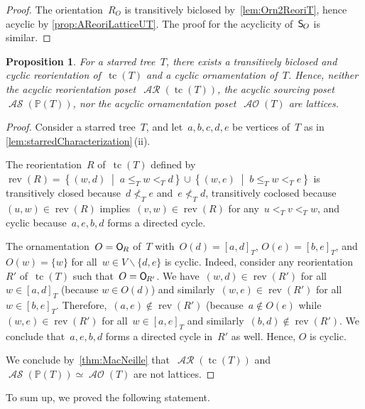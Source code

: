 \documentclass{amsart}
\newtheorem{proposition}[theorem]{Proposition}
\theoremstyle{definition}
\renewcommand{\c}[1]{\mathcal{#1}} %
\newcommand{\set}[2]{\left\{ #1 \;\middle|\; #2 \right\}} %
\newcommand{\ssm}{\smallsetminus} %
\DeclareMathOperator{\tc}{tc} %
\newcommand{\mymap}[2]{\mathsf{#1}_{\hspace{-.7pt}#2}}
\newcommand{\orn}[1]{\mymap{O}{#1}}  %
\DeclareMathOperator{\AOrn}{\c{AO}}  %
\DeclareMathOperator{\AReori}{\c{AR}}  %
\DeclareMathOperator{\rev}{rev} %
\newcommand{\sour}[1]{\mymap{S}{#1}}  %
\DeclareMathOperator{\ASour}{\mathcal{AS}}  %
\newcommand{\PP}{\mathbb P} %
\begin{document}
\begin{proof}
The orientation~$R_O$ is transitively biclosed by~\cref{lem:Orn2ReoriT}, hence acyclic by \cref{prop:AReoriLatticeUT}.
The proof for the acyclicity of~$\sour{O}$ is similar.
\end{proof}

\begin{proposition}
For a starred tree~$T$, there exists a transitively biclosed and cyclic reorientation \linebreak of~$\tc(T)$ and a cyclic ornamentation of~$T$.
Hence, neither the acyclic reorientation poset~$\AReori(\tc(T))$, the acyclic sourcing poset~$\ASour(\PP(T))$, nor the acyclic ornamentation poset~$\AOrn(T)$ are lattices.
\end{proposition}

\begin{proof}
Consider a starred tree~$T$, and let~$a,b,c,d,e$ be vertices of~$T$ as in \cref{lem:starredCharacterization}\,(ii).

The reorientation~$R$ of~$\tc(T)$ defined by~$\rev(R) = \set{(w,d)}{a \le_T w <_T d} \cup \set{(w,e)}{b \le_T w <_T e}$ is transitively closed because~$d \not<_T e$ and~$e \not<_T d$, transitively coclosed because~$(u,w) \in \rev(R)$ implies~$(v,w) \in \rev(R)$ for any~$u <_T v <_T w$, and cyclic because~$a, e, b, d$ forms a directed cycle.

The ornamentation~$O = \orn{R}$ of~$T$ with~$O(d) = [a,d]_T$, $O(e) = [b,e]_T$, and~$O(w) = \{w\}$ for all~$w \in V \ssm \{d,e\}$ is cyclic.
Indeed, consider any reorientation~$R'$ of~$\tc(T)$ such that~$O = \orn{R'}$.
We have~$(w,d) \in \rev(R')$ for all~$w \in [a,d]_T$ (because $w \in O(d)$) and similarly~$(w,e) \in \rev(R')$ for all~$w \in [b,e]_T$.
Therefore,~$(a,e) \notin \rev(R')$ (because~${a \notin O(e)}$ while~$(w,e) \in \rev(R')$ for all~$w \in [a,e]_T$ and similarly~$(b,d) \notin \rev(R')$.
We conclude that~$a, e, b, d$ forms a directed cycle in~$R'$ as well.
Hence, $O$ is cyclic.

We conclude by~\cref{thm:MacNeille} that~$\AReori(\tc(T))$ and~$\ASour(\PP(T)) \simeq \AOrn(T)$ are not lattices.
\end{proof}

To sum up, we proved the following statement.
\end{document}
